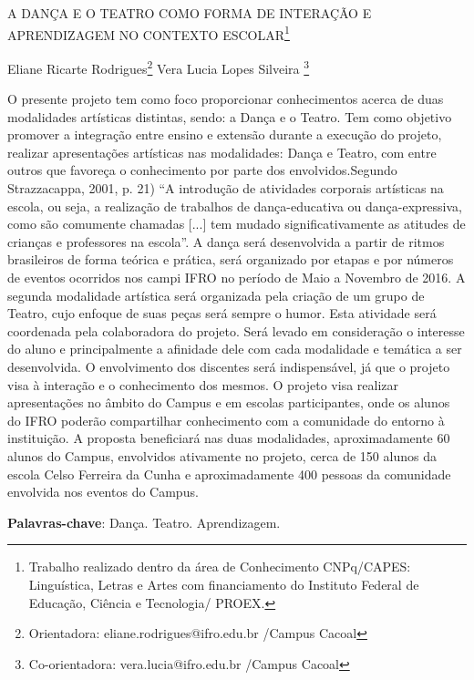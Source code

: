 \documentclass[article,12pt,onesidea,4paper,english,brazil]{abntex2}
\begin{document}
	
	
	\frenchspacing 
	
	\begin{center}
		\LARGE A DANÇA E O TEATRO COMO FORMA DE INTERAÇÃO E APRENDIZAGEM NO CONTEXTO ESCOLAR\footnote{Trabalho realizado dentro da área de Conhecimento CNPq/CAPES: Linguística, Letras e Artes com financiamento do Instituto Federal de Educação, Ciência e Tecnologia/ PROEX.}
		
		\normalsize
		Eliane Ricarte Rodrigues\footnote{Orientadora: eliane.rodrigues@ifro.edu.br /Campus Cacoal} 
		Vera Lucia Lopes Silveira \footnote{Co-orientadora: vera.lucia@ifro.edu.br /Campus Cacoal} 
		 
	\end{center}
	
	\noindent O presente projeto tem como foco proporcionar conhecimentos acerca de duas modalidades artísticas distintas, sendo: a Dança e o Teatro. Tem como objetivo promover a integração entre ensino e extensão durante a execução do projeto, realizar apresentações artísticas nas modalidades: Dança e Teatro, com entre outros que favoreça o conhecimento por parte dos envolvidos.Segundo Strazzacappa, 2001, p. 21) “A introdução de atividades corporais artísticas na escola, ou seja, a realização de trabalhos de dança-educativa ou dança-expressiva, como são comumente chamadas [...] tem mudado significativamente as atitudes de crianças e professores na escola”.
	A dança será desenvolvida a partir de ritmos brasileiros de forma teórica e prática, será organizado por etapas e por números de eventos ocorridos nos campi IFRO no período de Maio a Novembro de 2016.  A segunda modalidade artística será organizada pela criação de um grupo de Teatro, cujo enfoque de suas peças será sempre o humor. Esta atividade será coordenada pela colaboradora do projeto. Será levado em consideração o interesse do aluno e principalmente a afinidade dele com cada modalidade e temática a ser desenvolvida. O envolvimento dos discentes será indispensável, já que o projeto visa à interação e o conhecimento dos mesmos. O projeto visa realizar apresentações no âmbito do Campus e em escolas participantes, onde os alunos do IFRO poderão compartilhar conhecimento com a comunidade do entorno à instituição. A proposta beneficiará nas duas modalidades, aproximadamente 60 alunos do Campus, envolvidos ativamente no projeto, cerca de 150 alunos da escola Celso Ferreira da Cunha e aproximadamente 400 pessoas da comunidade envolvida nos eventos do Campus.
	
	\vspace{\onelineskip}
	
	\noindent
	\textbf{Palavras-chave}: Dança. Teatro. Aprendizagem.
	
\end{document}
